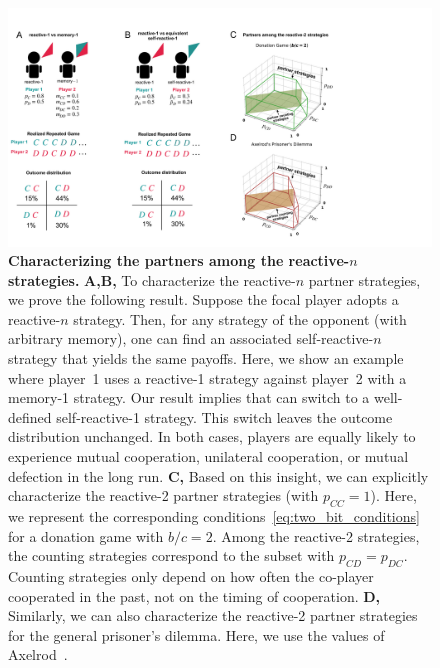 \documentclass[11pt]{article}
\begin{document}
\begin{figure}[t]
  \centering
  \includegraphics[width=\textwidth]{figures/conceptual_figure_results.pdf}
  \caption{
  \textbf{Characterizing the partners among the reactive-$n$ strategies.} 
{\bf A,B,} To characterize the reactive-$n$ partner strategies, we prove the following result. 
Suppose the focal player adopts a reactive-$n$ strategy. 
Then, for any strategy of the opponent (with arbitrary memory), one can find an associated self-reactive-$n$ strategy that yields the same payoffs. 
Here, we show an example where player~1 uses a reactive-1 strategy against player~2 with a memory-1 strategy. 
Our result implies that can switch to a well-defined self-reactive-1 strategy. 
This switch leaves the outcome distribution unchanged.
In both cases, players are equally likely to experience mutual cooperation, unilateral cooperation, or mutual defection in the long run. 
\textbf{C,} Based on this insight, we can explicitly characterize the reactive-2 partner strategies (with $p_{CC}\!=\!1$). 
Here, we represent the corresponding conditions~\eqref{eq:two_bit_conditions} for a donation game with $b/c\!=\!2$. 
Among the reactive-2 strategies, the counting strategies correspond to the subset with $p_{CD}\!=\!p_{DC}$. 
Counting strategies only depend on how often the co-player cooperated in the past, not on the timing of cooperation.
\textbf{D,} Similarly, we can also characterize the reactive-2 partner strategies for the general prisoner's dilemma. 
Here, we use the values of Axelrod~\citep{axelrod:AAAS:1981}.}\label{fig:conceptual_figure_results}
\end{figure}
\end{document}
